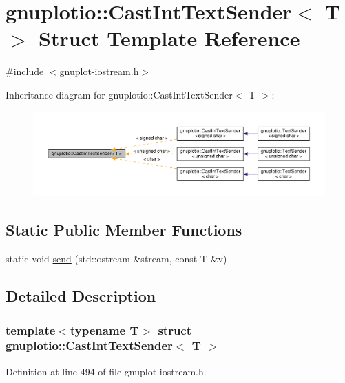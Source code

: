 \hypertarget{structgnuplotio_1_1_cast_int_text_sender}{}\section{gnuplotio\+:\+:Cast\+Int\+Text\+Sender$<$ T $>$ Struct Template Reference}
\label{structgnuplotio_1_1_cast_int_text_sender}


{\ttfamily \#include $<$gnuplot-\/iostream.\+h$>$}



Inheritance diagram for gnuplotio\+:\+:Cast\+Int\+Text\+Sender$<$ T $>$\+:
\nopagebreak
\begin{figure}[H]
\begin{center}
\leavevmode
\includegraphics[width=350pt]{structgnuplotio_1_1_cast_int_text_sender__inherit__graph}
\end{center}
\end{figure}
\subsection*{Static Public Member Functions}
\begin{DoxyCompactItemize}
\item 
static void \hyperlink{structgnuplotio_1_1_cast_int_text_sender_a42733f83f843a375437e7e5f716ea65e}{send} (std\+::ostream \&stream, const T \&v)
\end{DoxyCompactItemize}


\subsection{Detailed Description}
\subsubsection*{template$<$typename T$>$\newline
struct gnuplotio\+::\+Cast\+Int\+Text\+Sender$<$ T $>$}



Definition at line 494 of file gnuplot-\/iostream.\+h.



